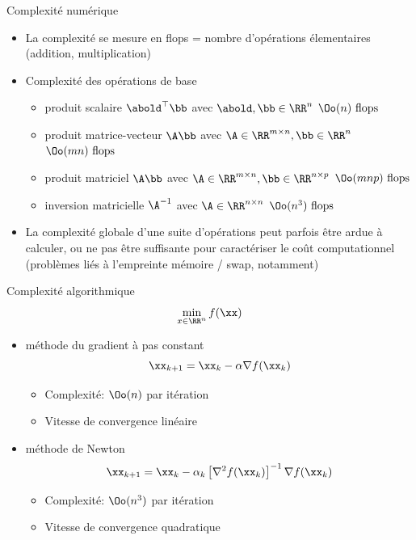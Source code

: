 \documentclass[9pt,table]{beamer} %
\begin{document}
\begin{frame}{Complexité numérique}

\begin{itemize}[label=\tiny$\blacksquare$]
  \item La complexité se mesure en flops = nombre d'opérations élementaires
  (addition, multiplication)
  \bigskip

  \item \alert{Complexité des opérations de base}
  \begin{itemize}[label=-]
    \item produit scalaire $\abold^\top \bb$ avec $\abold, \bb \in \RR^n$ \hfill $\Oo(n) \text{ flops}$
    \item produit matrice-vecteur $\A \bb$ avec $\A \in \RR^{m\times n}, \bb \in \RR^n$ \hfill $\Oo(mn) \text{ flops}$
    \item  produit matriciel $\A \bb$ avec $\A \in \RR^{m\times n}, \bb \in \RR^{n\times p}$ \hfill $\Oo(mnp) \text{ flops}$
    \item inversion matricielle $\A^{-1}$ avec $\A \in \RR^{n\times n}$  \hfill $\Oo(n^3) \text{ flops}$
  \end{itemize}
\vfill

 \item La complexité globale d'une suite d'opérations peut parfois être ardue à calculer, ou ne pas être suffisante pour caractériser le coût computationnel (problèmes liés à l'empreinte mémoire / swap, notamment)
 \end{itemize}
\end{frame}



\begin{frame}{Complexité algorithmique}
  $$\min_{x\in \RR^n} f(\xx)$$ 
  \bigbreak
\begin{itemize}[label=\tiny$\blacksquare$]
  \item   \alert{méthode du gradient à pas constant}
  \[\xx_{k+1} = \xx_k - \alpha \nabla f(\xx_k)\]
  \begin{itemize}[label=-]
    \item Complexité: $\Oo(n)$ par itération
    \item Vitesse de convergence linéaire
  \end{itemize}
  \vfill
  \item \alert{méthode de Newton}
  \[\xx_{k+1} = \xx_k - \alpha_k \left[\nabla^2 f(\xx_k)\right]^{-1}\nabla f(\xx_k)\]
  \begin{itemize}[label=-]
    \item Complexité: $\Oo(n^3)$ par itération
    \item Vitesse de convergence quadratique
  \end{itemize}
\end{itemize}

\end{frame}


%
%
\end{document}
